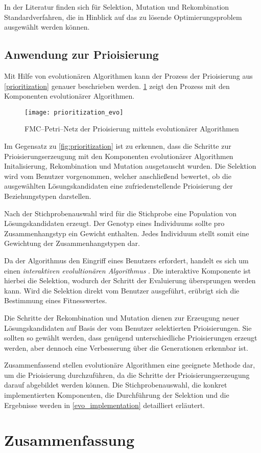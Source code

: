In der Literatur \cite{kw2007, tw2008, dj2006} finden sich für Selektion, Mutation und Rekombination Standardverfahren, die in Hinblick auf das zu lösende Optimierungsproblem ausgewählt werden können.

\subsection{Anwendung zur Prioisierung}

Mit Hilfe von evolutionären Algorithmen kann der Prozess der Prioisierung aus \cref{prioritization} genauer beschrieben werden. \cref{fig:prioritization_evo} zeigt den Prozess mit den Komponenten evolutionärer Algorithmen.

\begin{figure}[h]
\centering
\texttt{[image: prioritization\_evo]}
\caption{FMC--Petri--Netz der Prioisierung mittels evolutionärer Algorithmen}
\label{fig:prioritization_evo}
\end{figure}

Im Gegensatz zu \cref{fig:prioritization} ist zu erkennen, dass die Schritte zur Prioisierungserzeugung mit den Komponenten evolutionärer Algorithmen Initalisierung, Rekombination und Mutation ausgetauscht wurden. Die Selektion wird vom Benutzer vorgenommen, welcher anschließend bewertet, ob die ausgewählten Lösungskandidaten eine zufriedenstellende Prioisierung der Beziehungstypen darstellen.

Nach der Stichprobenauswahl wird für die Stichprobe eine Population von Lösungskandidaten erzeugt. Der Genotyp eines Individuums sollte pro Zusammenhangstyp ein Gewicht enthalten. Jedes Individuum stellt somit eine Gewichtung der Zusammenhangstypen dar.

Da der Algorithmus den Eingriff eines Benutzers erfordert, handelt es sich um einen \emph{interaktiven evolultionären Algorithmus} \cite{ht2001}. Die interaktive Komponente ist hierbei die Selektion, wodurch der Schritt der Evaluierung übersprungen werden kann. Wird die Selektion direkt vom Benutzer ausgeführt, erübrigt sich die Bestimmung eines Fitnesswertes.

Die Schritte der Rekombination und Mutation dienen zur Erzeugung neuer Lösungskandidaten auf Basis der vom Benutzer selektierten Prioisierungen. Sie sollten so gewählt werden, dass genügend unterschiedliche Prioisierungen erzeugt werden, aber dennoch eine Verbesserung über die Generationen erkennbar ist.

Zusammenfassend stellen evolutionäre Algorithmen eine geeignete Methode dar, um die Prioisierung durchzuführen, da die Schritte der Prioisierungserzeugung darauf abgebildet werden können. Die Stichprobenauswahl, die konkret implementierten Komponenten, die Durchführung der Selektion und die Ergebnisse werden in \cref{evo_implementation} detailliert erläutert.

\section{Zusammenfassung}